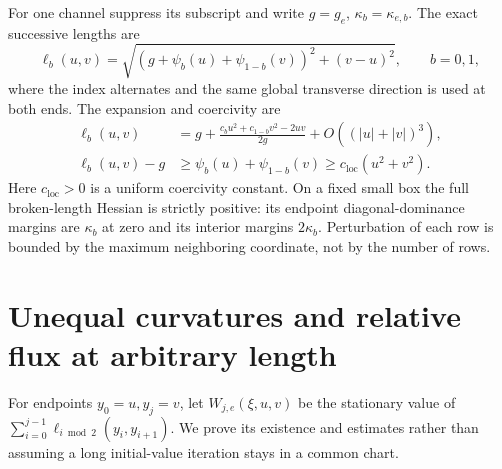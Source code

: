 For one channel suppress its subscript and write $g=g_e$, $\kappa_b=
\kappa_{e,b}$. The exact successive lengths are
\begin{equation}\label{eq:g-length}
 \ell_b(u,v)=\sqrt{(g+\psi_b(u)+\psi_{1-b}(v))^2+(v-u)^2},
 \qquad b=0,1,
\end{equation}
where the index alternates and the same global transverse direction is
used at both ends. The expansion and coercivity are
\begin{align}\label{eq:g-length-jet}
 \ell_b(u,v)&=g+\frac{c_bu^2+c_{1-b}v^2-2uv}{2g}
                      +O((|u|+|v|)^3),\\
 \ell_b(u,v)-g&\ge\psi_b(u)+\psi_{1-b}(v)
                      \ge c_{\mathrm{loc}}(u^2+v^2).\label{eq:g-coercive}
\end{align}
Here $c_{\mathrm{loc}}>0$ is a uniform coercivity constant. On a fixed small box the full broken-length
Hessian is strictly positive: its endpoint diagonal-dominance margins
are $\kappa_b$ at zero and its interior margins $2\kappa_b$.
Perturbation of each row is bounded by the maximum neighboring coordinate,
not by the number of rows.

\section{Unequal curvatures and relative flux at arbitrary length}
\label{sec:g-action}
For endpoints $y_0=u,y_j=v$, let $W_{j,e}(\xi,u,v)$ be the stationary
value of $\sum_{i=0}^{j-1}\ell_{i\bmod2}(y_i,y_{i+1})$.
We prove its existence and estimates rather than assuming a long
initial-value iteration stays in a common chart.

